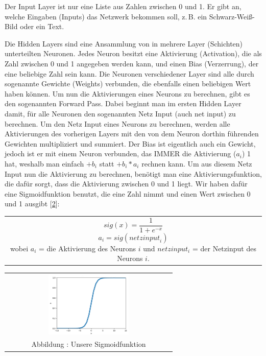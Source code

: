 \documentclass[11pt, a4paper, ngerman]{article}
\makeatletter
\newcommand*{\vcenteredhbox}[1]{\begin{tabular}{@{}c@{}}#1\end{tabular}} %
\makeatother
\begin{document}
		Der Input Layer ist nur eine Liste aus Zahlen zwischen 0 und 1. Er gibt an, welche Eingaben (Inputs) das Netzwerk bekommen soll, z.\,B. ein Schwarz-Weiß-Bild oder ein Text.
		
		Die Hidden Layers sind eine Ansammlung von in mehrere Layer (Schichten) unterteilten Neuronen. Jedes Neuron besitzt eine Aktivierung (Activation), die als Zahl zwischen 0 und 1 angegeben werden kann, und einen Bias (Verzerrung), der eine beliebige Zahl sein kann. Die Neuronen verschiedener Layer sind alle durch sogenannte Gewichte (Weights) verbunden, die ebenfalls einen beliebigen Wert haben können. Um nun die Aktivierungen eines Neurons zu berechnen, gibt es den sogenannten Forward Pass. Dabei beginnt man im ersten Hidden Layer damit, für alle Neuronen den sogenannten Netz Input (auch net input) zu berechnen. Um den Netz Input eines Neurons zu berechnen, werden alle Aktivierungen des vorherigen Layers mit den von dem Neuron dorthin führenden Gewichten multipliziert und summiert. Der Bias ist eigentlich auch ein Gewicht, jedoch ist er mit einem Neuron verbunden, das IMMER die Aktivierung ($a_i$) 1 hat, weshalb man einfach $+b_i$ statt $+b_i*a_i$ rechnen kann.
		Um aus diesem Netz Input nun die Aktivierung zu berechnen, benötigt man eine Aktivierungsfunktion, die dafür sorgt, dass die Aktivierung zwischen 0 und 1 liegt. Wir haben dafür eine Sigmoidfunktion benutzt, die eine Zahl nimmt und einen Wert zwischen 0 und 1 ausgibt [\hyperref[src:2]{2}]:
		\begin{center}
			\vcenteredhbox{\begin{minipage}{0.4\textwidth}
				{\Large
				\[sig(x)=\frac{1}{1+e^{-x}}\]
				\[a_i=sig\left({netzinput}_i \right)\]}
				wobei $a_i$ = die Aktivierung des Neurons $i$ und $netzinput_{i}$ = der Netzinput des Neurons $i$.
			\end{minipage}}
			\hspace{1em}
			\vcenteredhbox{
			\includegraphics[width=0.5\textwidth]{"pictures/sig_func.png"}\\[0.75ex]
			{\small Abbildung \thefigure: Unsere Sigmoidfunktion}
			}
		\end{center}
		
\end{document}
